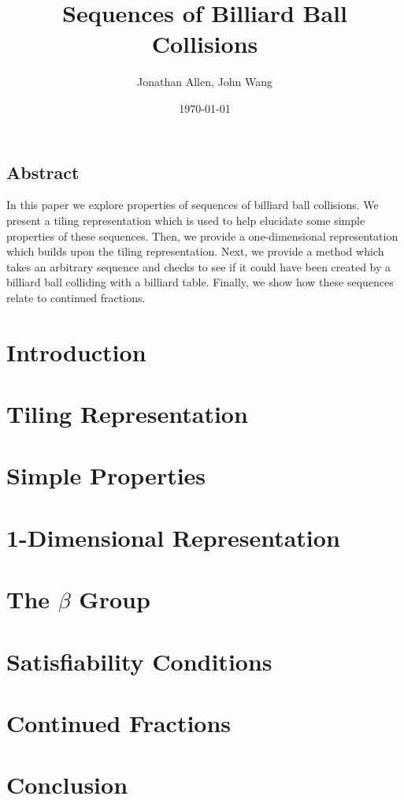 \documentclass[12pt]{amsart}   %
\begin{document}
\graphicspath{ {figures/} }

\title[Billiards]{Sequences of Billiard Ball Collisions}

\author{Jonathan Allen, John Wang}
\date{\today}

\maketitle

\subsection*{Abstract}

In this paper we explore properties of sequences of billiard ball collisions. We present a tiling representation which is used to help elucidate some simple properties of these sequences. Then, we provide a one-dimensional representation which builds upon the tiling representation. Next, we provide a method which takes an arbitrary sequence and checks to see if it could have been created by a billiard ball colliding with a billiard table. Finally, we show how these sequences relate to continued fractions.

\section{Introduction}


\section{Tiling Representation}


\section{Simple Properties}


\section{1-Dimensional Representation}


\section{The $\beta$ Group}


\section{Satisfiability Conditions}


\section{Continued Fractions}


\section{Conclusion}


\begin{appendix}
\end{appendix}
\end{document}
